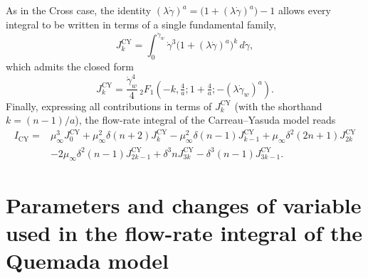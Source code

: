 \documentclass[lineno]{jfm}
\begin{document}
As in the Cross case, the identity
$(\lambda\dot{\gamma})^a = \bigl(1+(\lambda\dot{\gamma})^a\bigr) - 1$ allows every
integral to be written in terms of a single fundamental family,
\begin{equation}
J_k^{\mathrm{CY}} = \int_0^{\dot{\gamma}_w}
\dot{\gamma}^3 \bigl(1 + (\lambda \dot{\gamma})^a\bigr)^k\, d\dot{\gamma},
\end{equation}
which admits the closed form
\begin{equation}
J_k^{\mathrm{CY}} = \frac{\dot{\gamma}_w^4}{4}\,
{}_2F_1\!\left(-k, \tfrac{4}{a}; 1 + \tfrac{4}{a}; -(\lambda \dot{\gamma}_w)^a\right).
\end{equation}
Finally, expressing all contributions in terms of $J_k^{\mathrm{CY}}$ (with the
shorthand $k=(n-1)/a$), the flow-rate integral of the Carreau--Yasuda model reads
\begin{align}
I_{\mathrm{CY}}= &\mu_\infty^3 J_0^{\mathrm{CY}}
   + \mu_\infty^2 \delta (n+2) J_k^{\mathrm{CY}}
   - \mu_\infty^2 \delta (n-1) J_{k-1}^{\mathrm{CY}}
   + \mu_\infty \delta^2 (2n+1) J_{2k}^{\mathrm{CY}} \nonumber\\
   & - 2\mu_\infty \delta^2 (n-1) J_{2k-1}^{\mathrm{CY}}
   + \delta^3 n J_{3k}^{\mathrm{CY}}
   - \delta^3 (n-1) J_{3k-1}^{\mathrm{CY}}.
\end{align}

\section{Parameters and changes of variable used in the flow-rate integral of the
Quemada model}\label{appB}
\end{document}
